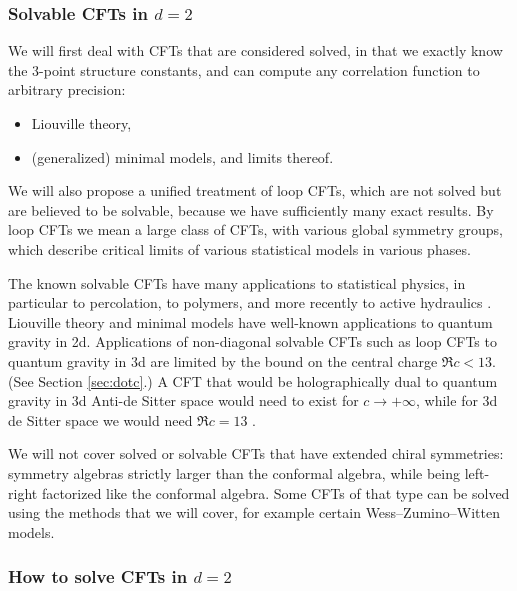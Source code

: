 \documentclass[12pt, a4paper]{article}
\begin{document}
 
\subsubsection*{Solvable CFTs in $d=2$}

We will first deal with CFTs that are considered solved, in that we exactly know the 3-point structure constants, and can compute any correlation function to arbitrary precision:
\begin{itemize}
 \item Liouville theory,
 \item (generalized) minimal models, and limits thereof. 
\end{itemize}
We will also propose a unified treatment of loop CFTs, which are not solved but are believed to be solvable, because we have sufficiently many exact results. By loop CFTs we mean a large class of CFTs, with various global symmetry groups, which describe critical limits of various statistical models in various phases.

The known solvable CFTs have many applications to statistical physics, in particular to percolation, to polymers, and more recently to active hydraulics \cite{jcpb23}. Liouville theory and minimal models have well-known applications to quantum gravity in 2d. Applications of non-diagonal solvable CFTs such as loop CFTs to quantum gravity in 3d are limited by the bound on the central charge $\Re c < 13$. (See Section \ref{sec:dotc}.) A CFT that would be holographically dual to quantum gravity in 3d Anti-de Sitter space would need to exist for $c\to+\infty$, while for 3d de Sitter space we would need $\Re c = 13$ \cite{god24, cemr24}.

We will not cover solved or solvable CFTs that have extended chiral symmetries: symmetry algebras strictly larger than the conformal algebra, while being left-right factorized like the conformal algebra. Some CFTs of that type can be solved using the methods that we will cover, for example certain Wess--Zumino--Witten models.

\subsubsection*{How to solve CFTs in $d=2$}
\end{document}

